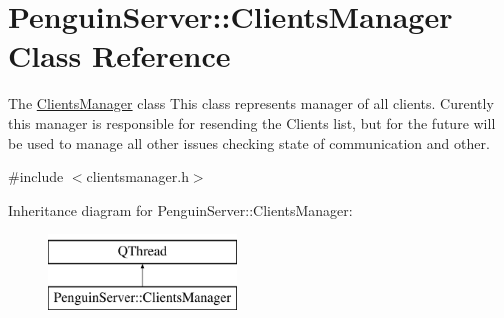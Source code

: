 \hypertarget{classPenguinServer_1_1ClientsManager}{\section{Penguin\-Server\-:\-:Clients\-Manager Class Reference}
\label{classPenguinServer_1_1ClientsManager}
}


The \hyperlink{classPenguinServer_1_1ClientsManager}{Clients\-Manager} class This class represents manager of all clients. Curently this manager is responsible for resending the Clients list, but for the future will be used to manage all other issues checking state of communication and other.  




{\ttfamily \#include $<$clientsmanager.\-h$>$}

Inheritance diagram for Penguin\-Server\-:\-:Clients\-Manager\-:\begin{figure}[H]
\begin{center}
\leavevmode
\includegraphics[height=2.000000cm]{classPenguinServer_1_1ClientsManager}
\end{center}
\end{figure}
